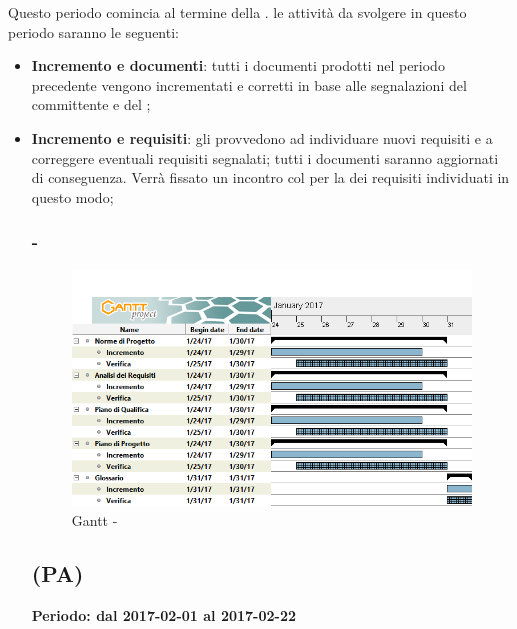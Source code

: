 \documentclass[./PianoDiProgetto.tex]{subfiles}
\begin{document}
  Questo periodo comincia al termine della \PerAR.  le attività da svolgere in questo periodo saranno le seguenti:
  \begin{itemize}
    \item \textbf{Incremento e  documenti}: tutti i documenti prodotti nel periodo precedente vengono incrementati e corretti in base alle segnalazioni del committente e del ;
    \item \textbf{Incremento e  requisiti}:  gli \ANP{} provvedono ad individuare nuovi requisiti e a correggere eventuali requisiti segnalati; tutti i documenti saranno aggiornati di conseguenza. Verrà fissato un incontro col  per la  dei requisiti individuati in questo modo;
  \newpage
  \subsubsection{ - \PerAD}
    \begin{figure}[!h]
    \centering
    \includegraphics[width=\textwidth]{images/AD}
    \caption{Gantt - \PerAD}
    \end{figure}

  \subsection{\PerPA{} (PA)}
  \textbf{Periodo: dal 2017-02-01 al 2017-02-22}


\end{itemize}
\end{document}
